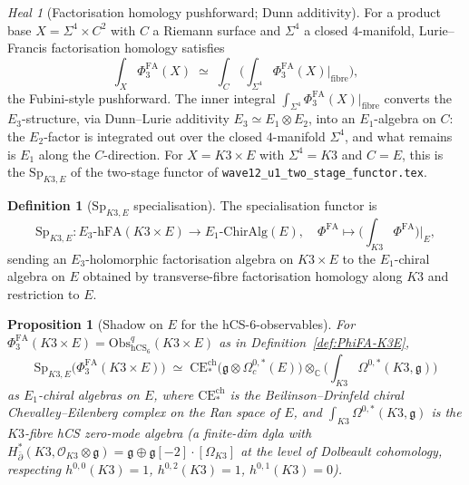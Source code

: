 \documentclass[11pt]{amsart}
\providecommand{\C}{\mathbb{C}}
\providecommand{\cO}{\mathcal{O}}
\providecommand{\dbar}{\bar{\partial}}
\providecommand{\g}{\mathfrak{g}}
\providecommand{\Obs}{\mathrm{Obs}}
\providecommand{\hCS}{\mathrm{hCS}}
\providecommand{\Eone}{E_{1}}
\providecommand{\Etwo}{E_{2}}
\providecommand{\CE}{\mathrm{CE}}
\providecommand{\PhiFA}{\Phi^{\mathrm{FA}}}
\providecommand{\SpF}{\mathrm{Sp}}
\theoremstyle{plain}
\newtheorem{proposition}[theorem]{Proposition}
\theoremstyle{definition}
\newtheorem{definition}[theorem]{Definition}
\theoremstyle{remark}
\newtheorem{heal}[theorem]{Heal}
\begin{document}
\begin{heal}[Factorisation homology pushforward; Dunn additivity]
\label{heal:3}
For a product base $X = \Sigma^{4} \times C^{2}$ with $C$ a Riemann
surface and $\Sigma^{4}$ a closed $4$-manifold, Lurie--Francis
factorisation homology satisfies
\begin{equation}\label{eq:pushforward}
\int_{X} \PhiFA_{3}(X) \;\simeq\; \int_{C}\biggl(\int_{\Sigma^{4}}
\PhiFA_{3}(X)\bigg|_{\text{fibre}} \biggr),
\end{equation}
the Fubini-style pushforward. The inner integral $\int_{\Sigma^{4}}
\PhiFA_{3}(X)|_{\text{fibre}}$ converts the $E_{3}$-structure, via
Dunn--Lurie additivity $E_{3}\simeq \Eone\otimes \Etwo$, into an
$\Eone$-algebra on $C$: the $\Etwo$-factor is integrated out over the
closed $4$-manifold $\Sigma^{4}$, and what remains is $\Eone$ along the
$C$-direction. For $X = K3 \times E$ with $\Sigma^{4} = K3$ and $C = E$,
this is the $\SpF_{K3, E}$ of the two-stage functor of
\texttt{wave12\_u1\_two\_stage\_functor.tex}.
\end{heal}

\begin{definition}[$\SpF_{K3,E}$ specialisation]\label{def:Sp-K3E}
The specialisation functor is
\[
\SpF_{K3, E}: E_{3}\text{-hFA}(K3\times E) \longrightarrow
\Eone\text{-ChirAlg}(E), \quad
\PhiFA \longmapsto \biggl(\int_{K3} \PhiFA\biggr)\bigg|_{E},
\]
sending an $E_{3}$-holomorphic factorisation algebra on $K3 \times E$
to the $E_{1}$-chiral algebra on $E$ obtained by transverse-fibre
factorisation homology along $K3$ and restriction to $E$.
\end{definition}

\begin{proposition}[Shadow on $E$ for the hCS-$6$-observables]
\label{prop:shadow-formula}
For $\PhiFA_{3}(K3\times E) = \Obs^{q}_{\hCS_{6}}(K3\times E)$ as in
Definition~\ref{def:PhiFA-K3E},
\begin{equation}\label{eq:shadow}
\SpF_{K3,E}\bigl(\PhiFA_{3}(K3\times E)\bigr) \;\simeq\;
\CE^{\mathrm{ch}}_{\ast}\bigl(\g \otimes \Omega^{0,\ast}_{c}(E)\bigr)
\otimes_{\C} \biggl(\int_{K3}\Omega^{0,\ast}(K3,\g)\biggr)
\end{equation}
as $\Eone$-chiral algebras on $E$, where
$\CE^{\mathrm{ch}}_{\ast}$ is the Beilinson--Drinfeld chiral
Chevalley--Eilenberg complex on the Ran space of $E$, and
$\int_{K3}\Omega^{0,\ast}(K3,\g)$ is the $K3$-fibre hCS zero-mode algebra
(a finite-dim dgla with $H^{\ast}_{\dbar}(K3,\cO_{K3}\otimes \g) =
\g\oplus \g[-2]\cdot [\Omega_{K3}]$ at the level of Dolbeault cohomology,
respecting $h^{0,0}(K3) = 1$, $h^{0,2}(K3)=1$, $h^{0,1}(K3) = 0$).
\end{proposition}
\end{document}
